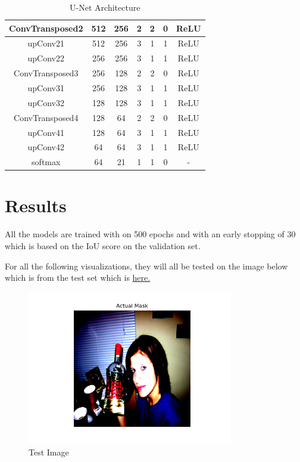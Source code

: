 \documentclass{article}
\begin{document}
\begin{table}[h!]
\begin{tabular}{|c|c|c|c|c|c|c|}
    ConvTransposed2 & 512         & 256          & 2      & 2      & 0       & ReLU       \\\hline
    upConv21        & 512         & 256          & 3      & 1      & 1       & ReLU       \\\hline
    upConv22        & 256         & 256          & 3      & 1      & 1       & ReLU       \\\hline
    ConvTransposed3 & 256         & 128          & 2      & 2      & 0       & ReLU       \\\hline
    upConv31        & 256         & 128          & 3      & 1      & 1       & ReLU       \\\hline
    upConv32        & 128         & 128          & 3      & 1      & 1       & ReLU       \\\hline
    ConvTransposed4 & 128         & 64           & 2      & 2      & 0       & ReLU       \\\hline
    upConv41        & 128         & 64           & 3      & 1      & 1       & ReLU       \\\hline
    upConv42        & 64          & 64           & 3      & 1      & 1       & ReLU       \\\hline
    softmax         & 64          & 21           & 1      & 1      & 0       & -          \\
    \hline
  \end{tabular}
  \caption{U-Net Architecture}
  \label{tab:unet_architecture}
\end{table}

\newpage


\section{Results}
All the models are trained with on 500 epochs and with an early stopping of 30 which is based on the IoU score on the validation set.

For all the following visualizations, they will all be tested on the image below which is from the test set which is \hyperref[fig:test_img]{here.}

\begin{figure}[h!]
  \centering
  \includegraphics[width=0.8\textwidth]{include/plots/actual.png}
  \caption{Test Image}
  \label{fig:test_img}
\end{figure}
\end{document}
